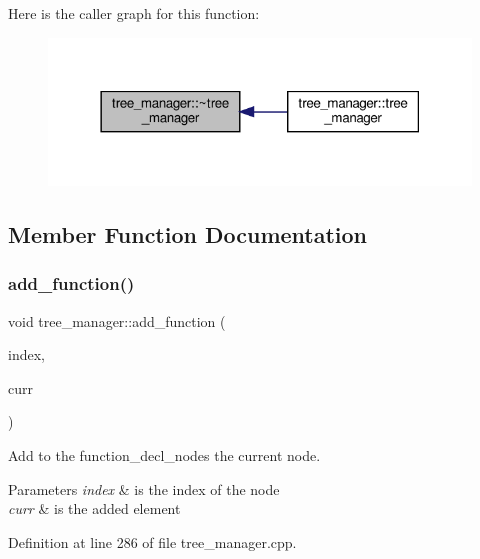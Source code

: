 Here is the caller graph for this function\+:
\nopagebreak
\begin{figure}[H]
\begin{center}
\leavevmode
\includegraphics[width=318pt]{d2/ddd/classtree__manager_aa1d84289bfb70f965da1a12446fd947f_icgraph}
\end{center}
\end{figure}


\subsection{Member Function Documentation}
\mbox{\label{classtree__manager_a00ae3af2a37d748903a83989b2b6e567}} 
\subsubsection{\texorpdfstring{add\+\_\+function()}{add\_function()}}
{\footnotesize\ttfamily void tree\+\_\+manager\+::add\+\_\+function (\begin{DoxyParamCaption}\item[{unsigned int}]{index,  }\item[{\hyperlink{tree__node_8hpp_a6ee377554d1c4871ad66a337eaa67fd5}{tree\+\_\+node\+Ref}}]{curr }\end{DoxyParamCaption})}



Add to the function\+\_\+decl\+\_\+nodes the current node. 


\begin{DoxyParams}{Parameters}
{\em index} & is the index of the node \\
\hline
{\em curr} & is the added element \\
\hline
\end{DoxyParams}


Definition at line 286 of file tree\+\_\+manager.\+cpp.



